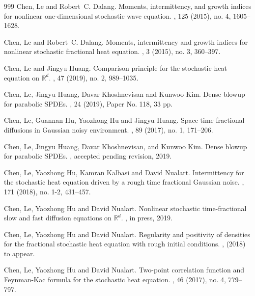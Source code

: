\documentclass[a4paper,12pt]{article}
\theoremstyle{plain}
\theoremstyle{definition}
\newcommand{\R}{\mathbb{R}}
\begin{document}
\begin{thebibliography}{999}
Chen, Le  and Robert~C. Dalang.
\newblock Moments, intermittency, and growth indices for nonlinear one-dimensional stochastic wave equation.
, 125 (2015), no. 4, 1605--1628.

Chen, Le  and Robert~C. Dalang.
\newblock Moments, intermittency and growth indices for nonlinear stochastic fractional heat equation.
, 3 (2015), no. 3, 360--397.

Chen, Le and Jingyu Huang.
\newblock Comparison principle for the stochastic heat equation on $\mathbb{R}^d$.
,  47 (2019), no. 2, 989--1035.


Chen, Le, Jingyu Huang, Davar Khoshnevisan and Kunwoo Kim.
\newblock Dense blowup for parabolic SPDEs.
, 24 (2019), Paper No. 118, 33 pp.

Chen, Le,  Guannan Hu, Yaozhong Hu and Jingyu Huang.
\newblock Space-time fractional diffusions in Gaussian noisy environment.
, 89 (2017), no. 1, 171--206.

Chen, Le, Jingyu Huang, Davar Khoshnevisan, and Kunwoo Kim.
\newblock Dense blowup for parabolic SPDEs.
, accepted pending revision, 2019.


Chen, Le, Yaozhong  Hu, Kamran Kalbasi and David Nualart.
\newblock Intermittency for the stochastic heat equation driven by a rough time
fractional Gaussian noise.
, 171 (2018), no. 1-2, 431--457.


Chen, Le,  Yaozhong Hu and David Nualart.
\newblock Nonlinear stochastic time-fractional slow and fast diffusion equations
on $\R^d$.
, in press, 2019.

Chen, Le, Yaozhong Hu and David Nualart.
\newblock Regularity and positivity of densities for the fractional stochastic
heat equation with rough initial conditions.
, (2018) to appear.

Chen, Le,  Yaozhong Hu and David Nualart.
\newblock Two-point correlation function and Feynman-Kac formula for the
stochastic heat equation.
, 46 (2017), no. 4, 779--797.



\end{thebibliography}
\end{document}
